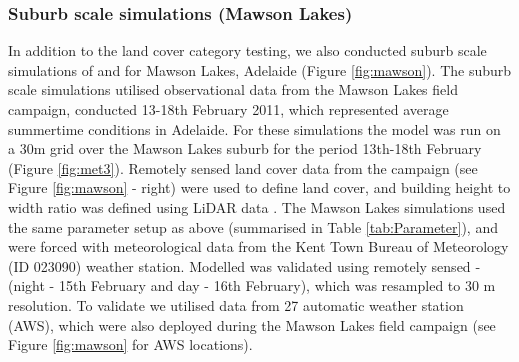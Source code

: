 \documentclass[final,3p,times,authoryear]{elsarticle}
\begin{document}
\subsubsection{Suburb scale simulations (Mawson Lakes)}\label{sec:suburbsim} 
 
In addition to the land cover category testing, we also conducted suburb scale simulations of  and  for Mawson Lakes, Adelaide (Figure \ref{fig:mawson}). The suburb scale simulations utilised observational data from the Mawson Lakes field campaign, conducted 13-18th February 2011, which represented average summertime conditions in Adelaide. For these simulations the model was run on a 30m grid over the Mawson Lakes suburb for the period 13th-18th February (Figure \ref{fig:met3}).  Remotely sensed land cover data from the campaign (see Figure \ref{fig:mawson} - right) were used to define land cover, and building height to width ratio was defined using LiDAR data \citep{Broadbent2016}. The Mawson Lakes simulations used the same parameter setup as above (summarised in Table \ref{tab:Parameter}), and were forced with meteorological data from the Kent Town Bureau of Meteorology (ID 023090) weather station. Modelled  was validated using remotely sensed ­ (night - 15th February and day - 16th February), which was resampled to 30 m resolution. To validate  we utilised data from 27 automatic weather station (AWS), which were also deployed during the Mawson Lakes field campaign (see Figure \ref{fig:mawson} for AWS locations). 
 
\end{document}
